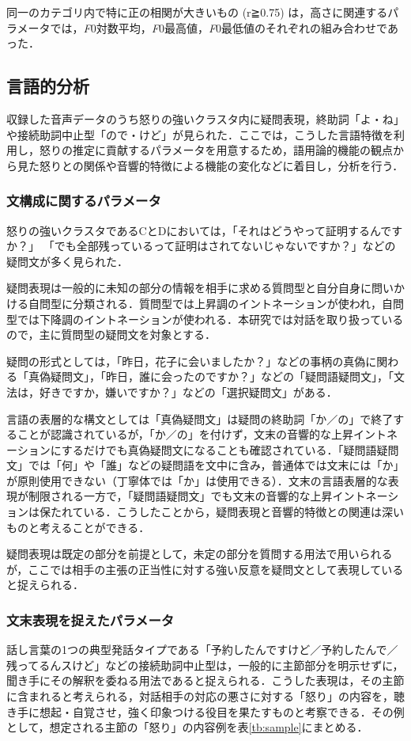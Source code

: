 \documentclass[japanese]{jnlp_1.3c}
\begin{document}
同一のカテゴリ内で特に正の相関が大きいもの (r≧0.75) は，高さに関連するパラメータでは，{\it F}{\tiny 0}対数平均，{\it F}{\tiny 0}最高値，{\it F}{\tiny 0}最低値のそれぞれの組み合わせであった．
 
\subsection{言語的分析}
収録した音声データのうち怒りの強いクラスタ内に疑問表現，終助詞「よ・ね」や接続助詞中止型「ので・けど」が見られた\cite[など]{Arimoto2006a,Arimoto2006b}．ここでは，こうした言語特徴を利用し，怒りの推定に貢献するパラメータを用意するため，語用論的機能の観点から見た怒りとの関係や音響的特徴による機能の変化などに着目し，分析を行う．

\subsubsection{文構成に関するパラメータ}
怒りの強いクラスタであるCとDにおいては，「それはどうやって証明するんですか？」
「でも全部残っているって証明はされてないじゃないですか？」などの疑問文が多く見られた．

疑問表現は一般的に未知の部分の情報を相手に求める質問型と自分自身に問いかける自問型に分類される\cite{Masuoka1992}．質問型では上昇調のイントネーションが使われ，自問型では下降調のイントネーションが使われる．本研究では対話を取り扱っているので，主に質問型の疑問文を対象とする．

疑問の形式としては，「昨日，花子に会いましたか？」などの事柄の真偽に関わる「真偽疑問文」，「昨日，誰に会ったのですか？」などの「疑問語疑問文」，「文法は，好きですか，嫌いですか？」などの「選択疑問文」がある．

言語の表層的な構文としては「真偽疑問文」は疑問の終助詞「か／の」で終了することが認識されているが，「か／の」を付けず，文末の音響的な上昇イントネーションにするだけでも真偽疑問文になることも確認されている．「疑問語疑問文」では「何」や「誰」などの疑問語を文中に含み，普通体では文末には「か」が原則使用できない（丁寧体では「か」は使用できる）\cite{Masuoka1992}．文末の言語表層的な表現が制限される一方で，「疑問語疑問文」でも文末の音響的な上昇イントネーションは保たれている．こうしたことから，疑問表現と音響的特徴との関連は深いものと考えることができる．

疑問表現は既定の部分を前提として，未定の部分を質問する用法で用いられるが，ここでは相手の主張の正当性に対する強い反意を疑問文として表現していると捉えられる．

\subsubsection{文末表現を捉えたパラメータ}
話し言葉の1つの典型発話タイプである「予約したんですけど／予約したんで／残ってるんスけど」などの接続助詞中止型は，一般的に主節部分を明示せずに，聞き手にその解釈を委ねる用法であると捉えられる．こうした表現は，その主節に含まれると考えられる，対話相手の対応の悪さに対する「怒り」の内容を，聴き手に想起・自覚させ，強く印象つける役目を果たすものと考察できる．その例として，想定される主節の「怒り」の内容例を表\ref{tb:sample}にまとめる．
\end{document}
